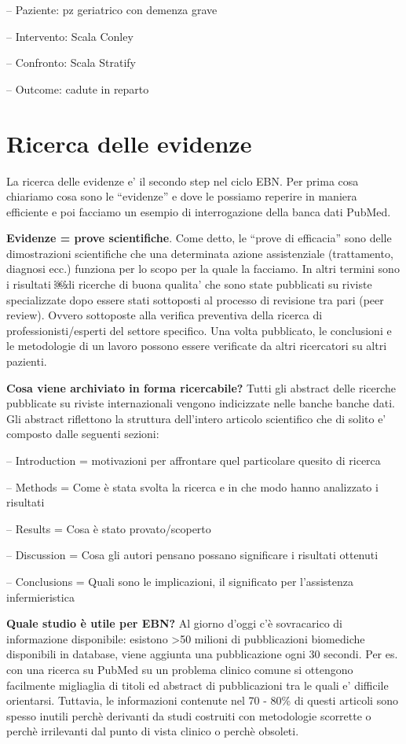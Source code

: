 \documentclass[]{book}
\begin{document}
-- Paziente: pz geriatrico con demenza grave

-- Intervento: Scala Conley

-- Confronto: Scala Stratify

-- Outcome: cadute in reparto

\hypertarget{ricerca-delle-evidenze}{%
\section{Ricerca delle evidenze}\label{ricerca-delle-evidenze}}

La ricerca delle evidenze e' il secondo step nel ciclo EBN. Per prima cosa chiariamo cosa sono le ``evidenze'' e dove le possiamo reperire in maniera efficiente e poi facciamo un esempio di interrogazione della banca dati PubMed.

\textbf{Evidenze = prove scientifiche}. Come detto, le ``prove di efficacia'' sono delle dimostrazioni scientifiche che una determinata azione assistenziale (trattamento, diagnosi ecc.) funziona per lo scopo per la quale la facciamo. In altri termini sono i risultati ￼di ricerche di buona qualita' che sono state pubblicati su riviste specializzate dopo essere stati sottoposti al processo di revisione tra pari (peer review). Ovvero sottoposte alla verifica preventiva della ricerca di professionisti/esperti del settore specifico. Una volta pubblicato, le conclusioni e le metodologie di un lavoro possono essere verificate da altri ricercatori su altri pazienti.

\textbf{Cosa viene archiviato in forma ricercabile?} Tutti gli abstract delle ricerche pubblicate su riviste internazionali vengono indicizzate nelle banche banche dati. Gli abstract riflettono la struttura dell'intero articolo scientifico che di solito e' composto dalle seguenti sezioni:

-- Introduction = motivazioni per affrontare quel particolare quesito di ricerca

-- Methods = Come è stata svolta la ricerca e in che modo hanno analizzato i risultati

-- Results = Cosa è stato provato/scoperto

-- Discussion = Cosa gli autori pensano possano significare i risultati ottenuti

-- Conclusions = Quali sono le implicazioni, il significato per l'assistenza infermieristica

\textbf{Quale studio è utile per EBN?} Al giorno d'oggi c'è sovracarico di informazione disponibile: esistono \textgreater{}50 milioni di pubblicazioni biomediche disponibili in database, viene aggiunta una pubblicazione ogni 30 secondi. Per es. con una ricerca su PubMed su un problema clinico comune si ottengono facilmente migliaglia di titoli ed abstract di pubblicazioni tra le quali e' difficile orientarsi. Tuttavia, le informazioni contenute nel 70 - 80\% di questi articoli sono spesso inutili perchè derivanti da studi costruiti con metodologie scorrette o perchè irrilevanti dal punto di vista clinico o perchè obsoleti.
\end{document}
